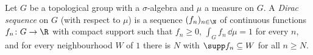 Let $G$ be a topological group with a $\sigma$-algebra and $\mu$ a measure on $G$. A \emph{Dirac sequence} on $G$ (with
respect to $\mu$) is a sequence $(f_n)_{n\in\N}$ of continuous functions $f_n\colon G\to\R$ with compact support such
that $f_n\ge0$, $\int_Gf_n\,\dd\mu=1$ for every $n$, and for every neighbourhood $W$ of $1$ there is $N$ with
$\supp f_n\subseteq W$ for all $n\ge N$.
